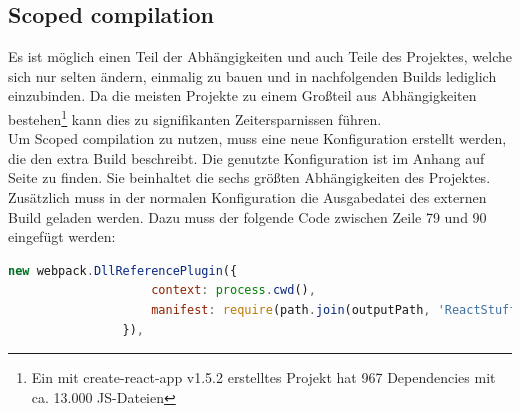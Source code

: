 \documentclass[11pt]{report}
\begin{document}

        	\subsection{Scoped compilation}
        		\label{section:scopedCompilation}
        		Es ist möglich einen Teil der Abhängigkeiten und auch Teile des Projektes, welche sich nur selten ändern, einmalig zu bauen und in nachfolgenden Builds lediglich einzubinden. Da die meisten Projekte zu einem Großteil aus Abhängigkeiten bestehen\footnote{Ein mit create-react-app v1.5.2 erstelltes Projekt hat 967 Dependencies mit ca. 13.000 JS-Dateien} kann dies zu signifikanten Zeitersparnissen führen.\\
        		Um Scoped compilation zu nutzen, muss eine neue Konfiguration erstellt werden, die den extra Build beschreibt. Die genutzte Konfiguration ist im Anhang auf Seite \pageref{vendorConfig} zu finden. Sie beinhaltet die sechs größten Abhängigkeiten des Projektes. Zusätzlich muss in der normalen Konfiguration die Ausgabedatei des externen Build geladen werden. Dazu muss der folgende Code zwischen Zeile 79 und 90 eingefügt werden:\\
        		\begin{center}
		        	\lstset{%
					    caption=Einbindung der Scoped compilation,
						basicstyle=\footnotesize,
						numbers=none
					}
		        	\begin{lstlisting}[language=JavaScript]
						new webpack.DllReferencePlugin({
		            context: process.cwd(),
		            manifest: require(path.join(outputPath, 'ReactStuff.json'))
		        }),
		        	\end{lstlisting}
	        	\end{center}
        		
\end{document}
